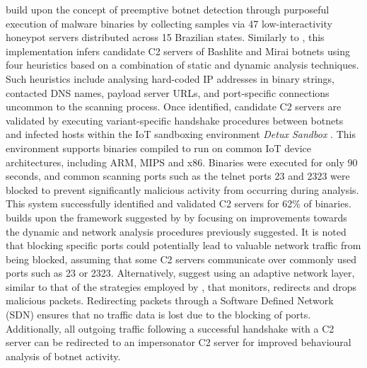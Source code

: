 \citet{Bastos2019} build upon the concept of preemptive botnet detection through purposeful execution of malware binaries by collecting samples via 47 low-interactivity honeypot servers distributed across 15 Brazilian states. Similarly to \citet{Moon2012}, this implementation infers candidate C2 servers of Bashlite and Mirai botnets using four heuristics based on a combination of static and dynamic analysis techniques. Such heuristics include analysing hard-coded IP addresses in binary strings, contacted DNS names, payload server URLs, and port-specific connections uncommon to the scanning process. Once identified, candidate C2 servers are validated by executing variant-specific handshake procedures between botnets and infected hosts within the IoT sandboxing environment \textit{Detux Sandbox} \citep{Detux2016}. This environment supports binaries compiled to run on common IoT device architectures, including ARM, MIPS and x86. Binaries were executed for only 90 seconds, and common scanning ports such as the telnet ports 23 and 2323 were blocked to prevent significantly malicious activity from occurring during analysis. This system successfully identified and validated C2 servers for 62\% of binaries. \citet{Ceron2019} builds upon the framework suggested by \citet{Bastos2019} by focusing on improvements towards the dynamic and network analysis procedures previously suggested. It is noted that blocking specific ports could potentially lead to valuable network traffic from being blocked, assuming that some C2 servers communicate over commonly used ports such as 23 or 2323. Alternatively, \citet{Ceron2019} suggest using an adaptive network layer, similar to that of the strategies employed by \citet{PaPa2016}, that monitors, redirects and drops malicious packets. Redirecting packets through a Software Defined Network (SDN) ensures that no traffic data is lost due to the blocking of ports. Additionally, all outgoing traffic following a successful handshake with a C2 server can be redirected to an impersonator C2 server for improved behavioural analysis of botnet activity.

